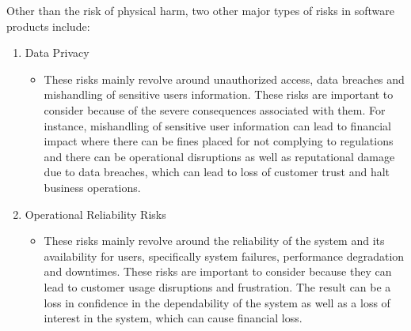 \documentclass{article}
\begin{document}
\begin{enumerate}
    Other than the risk of physical harm, two other major types of risks in software products include:
    \begin{enumerate}
        \item Data Privacy
        \begin{itemize}
            \item These risks mainly revolve around unauthorized access, data breaches and mishandling of sensitive users information. These risks are important to consider because of the severe consequences associated with them. For instance, mishandling of sensitive user information can lead to financial impact where there can be fines placed for not complying to regulations and there can be operational disruptions as well as reputational damage due to data breaches, which can lead to loss of customer trust and halt business operations.
        \end{itemize}
        \item Operational Reliability Risks
        \begin{itemize}
            \item These risks mainly revolve around the reliability of the system and its availability for users, specifically system failures, performance degradation and downtimes. These risks are important to consider because they can lead to customer usage disruptions and frustration. The result can be a loss in confidence in the dependability of the system as well as a loss of interest in the system, which can cause financial loss.
        \end{itemize}
    \end{enumerate}
    
\end{enumerate}
    
\end{document}
